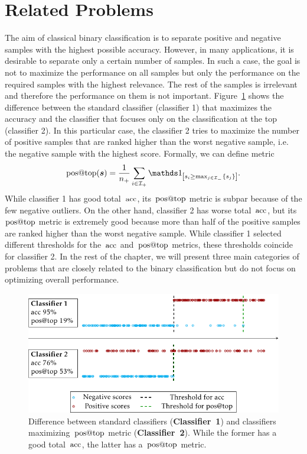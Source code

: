 
\section{Related Problems}\label{sec: related problems}

The aim of classical binary classification is to separate positive and negative samples with the highest possible accuracy. However, in many applications, it is desirable to separate only a certain number of samples. In such a case, the goal is not to maximize the performance on all samples but only the performance on the required samples with the highest relevance. The rest of the samples is irrelevant and therefore the performance on them is not important. Figure~\ref{fig: standard vs. aatp} shows the difference between the standard classifier (classifier 1) that maximizes the accuracy and the classifier that focuses only on the classification at the top (classifier 2). In this particular case, the classifier 2 tries to maximize the number of positive samples that are ranked higher than the worst negative sample, i.e. the negative sample with the highest score. Formally, we can define metric
\begin{equation*}
  \postop(\bm{s}) = \frac{1}{\npos} \sum_{i \in \Ipos} \Iverson{s_i \geq \max_{j \in \Ineg}\{s_j\}}.
\end{equation*}
While classifier 1 has good total~$\operatorname{acc}$, its~$\operatorname{pos@top}$ metric is subpar because of the few negative outliers. On the other hand, classifier 2 has worse total~$\operatorname{acc}$, but its~$\operatorname{pos@top}$ metric is extremely good because more than half of the positive samples are ranked higher than the worst negative sample. While classifier 1 selected different thresholds for the~$\operatorname{acc}$ and~$\operatorname{pos@top}$ metrics, these thresholds coincide for classifier 2. In the rest of the chapter, we will present three main categories of problems that are closely related to the binary classification but do not focus on optimizing overall performance.

\begin{figure}[t]
  \centering
  \includegraphics[width = \linewidth]{images/standard_aatp_comparison.pdf}
  \caption{Difference between standard classifiers (\textbf{Classifier~1}) and classifiers maximizing~$\operatorname{pos@top}$ metric (\textbf{Classifier~2}). While the former has a good total~$\operatorname{acc}$, the latter has a~$\operatorname{pos@top}$ metric.}
  \label{fig: standard vs. aatp}
\end{figure}

